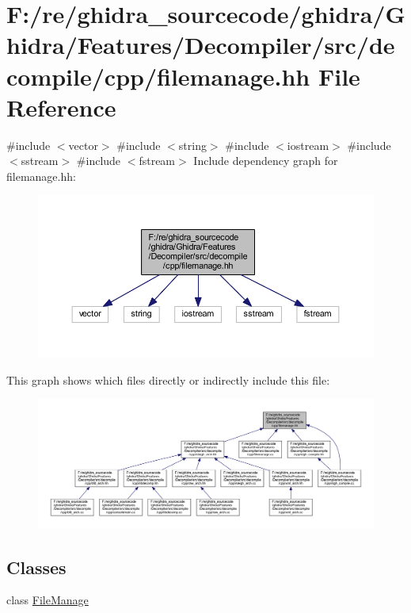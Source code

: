 \hypertarget{filemanage_8hh}{}\section{F\+:/re/ghidra\+\_\+sourcecode/ghidra/\+Ghidra/\+Features/\+Decompiler/src/decompile/cpp/filemanage.hh File Reference}
\label{filemanage_8hh}
{\ttfamily \#include $<$vector$>$}\newline
{\ttfamily \#include $<$string$>$}\newline
{\ttfamily \#include $<$iostream$>$}\newline
{\ttfamily \#include $<$sstream$>$}\newline
{\ttfamily \#include $<$fstream$>$}\newline
Include dependency graph for filemanage.\+hh\+:
\nopagebreak
\begin{figure}[H]
\begin{center}
\leavevmode
\includegraphics[width=350pt]{filemanage_8hh__incl}
\end{center}
\end{figure}
This graph shows which files directly or indirectly include this file\+:
\nopagebreak
\begin{figure}[H]
\begin{center}
\leavevmode
\includegraphics[width=350pt]{filemanage_8hh__dep__incl}
\end{center}
\end{figure}
\subsection*{Classes}
\begin{DoxyCompactItemize}
\item 
class \mbox{\hyperlink{class_file_manage}{File\+Manage}}
\end{DoxyCompactItemize}
